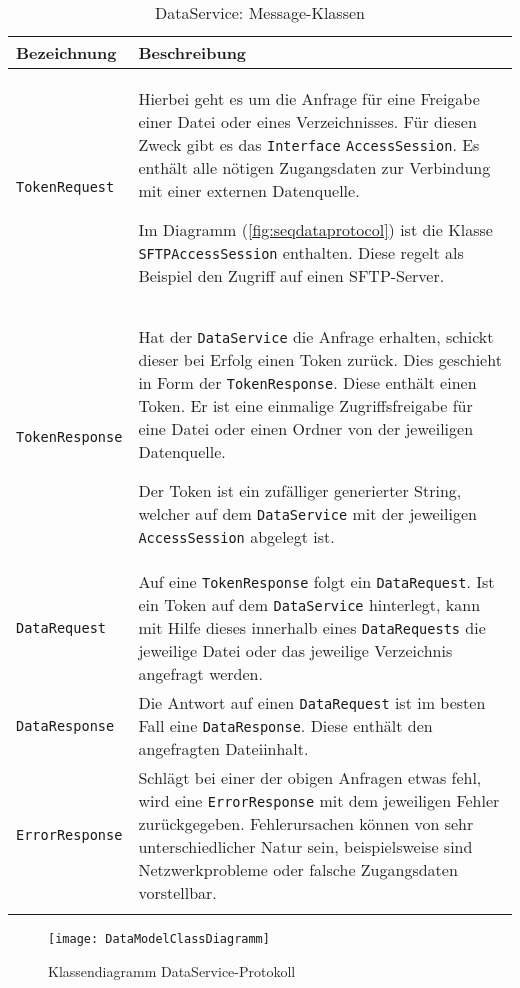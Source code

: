 \begin{longtable}{|p{4cm}| p{8cm}|}
  \hline
    \textbf{Bezeichnung} & \textbf{Beschreibung}\\\hline
    \texttt{TokenRequest} & Hierbei geht es um die Anfrage für eine Freigabe einer Datei oder eines Verzeichnisses. Für diesen Zweck gibt es das \texttt{Interface} \texttt{AccessSession}. Es enthält alle nötigen Zugangsdaten zur Verbindung mit einer externen Datenquelle. \newline
    
    Im Diagramm (\autoref{fig:seqdataprotocol}) ist die Klasse \texttt{SFTPAccessSession} enthalten. Diese regelt als Beispiel den Zugriff auf einen SFTP-Server.
    \\\hline
    \texttt{TokenResponse} &    
    Hat der \texttt{DataService} die Anfrage erhalten, schickt dieser bei Erfolg einen Token zurück. Dies geschieht in Form der \texttt{TokenResponse}. Diese enthält einen \gls{Token}. Er ist eine einmalige Zugriffsfreigabe für eine Datei oder einen Ordner von der jeweiligen Datenquelle.\newline
    
    
    Der \gls{Token} ist ein zufälliger generierter String, welcher auf dem \texttt{DataService} mit der jeweiligen \texttt{AccessSession} abgelegt ist.\\\hline
    \texttt{DataRequest} & Auf eine \texttt{TokenResponse} folgt ein \texttt{DataRequest}. Ist ein \gls{Token} auf dem \texttt{DataService} hinterlegt, kann mit Hilfe dieses innerhalb eines \texttt{DataRequests} die jeweilige Datei oder das jeweilige Verzeichnis angefragt werden. \\\hline
    \texttt{DataResponse} & Die Antwort auf einen \texttt{DataRequest} ist im besten Fall eine \texttt{DataResponse}. Diese enthält den angefragten Dateiinhalt. \\\hline
    \texttt{ErrorResponse} & Schlägt bei einer der obigen Anfragen etwas fehl, wird eine \texttt{ErrorResponse} mit dem jeweiligen Fehler zurückgegeben. Fehlerursachen können von sehr unterschiedlicher Natur sein, beispielsweise sind Netzwerkprobleme oder falsche Zugangsdaten vorstellbar.\\\hline
        \caption{DataService: Message-Klassen}
    \label{dataservice-bodies}
\end{longtable}


    \begin{figure}[H]
    \centering
    \texttt{[image: DataModelClassDiagramm]}
    \caption{Klassendiagramm DataService-Protokoll}
    \label{fig:dataclass}
    \end{figure}

